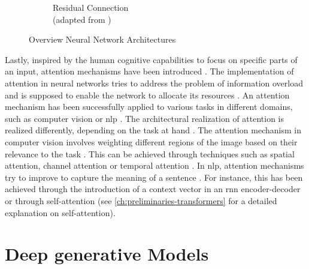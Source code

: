 \begin{figure}
\begin{subfigure}{0.7\textwidth}
        \captionsetup{justification=centering}
        \caption{Residual Connection \\(adapted from \cite{hassan2019ResNet3450})} \label{fig:resnet}
      \end{subfigure}%
    \hspace*{\fill}   %
  \caption[Overview Neural Network Architectures]{Overview Neural Network Architectures} \label{fig:NN_architectures_Overview}
\end{figure}

Lastly, inspired by the human cognitive capabilities to focus on specific parts of an input, attention mechanisms have been introduced \cite{niu2021ReviewAttentionMechanism, aggarwal2018NeuralNetworksDeep}.
The implementation of attention in neural networks tries to address the problem of information overload and is supposed to enable the network to allocate its resources \cite{niu2021ReviewAttentionMechanism}.
An attention mechanism has been successfully applied to various tasks in different domains, such as computer vision or \gls{nlp} \cite{niu2021ReviewAttentionMechanism}.
The architectural realization of attention is realized differently, depending on the task at hand \cite{aggarwal2018NeuralNetworksDeep}.
The attention mechanism in computer vision involves weighting different regions of the image based on their relevance to the task \cite{aggarwal2018NeuralNetworksDeep}. 
This can be achieved through techniques such as spatial attention, channel attention or temporal attention \cite{guo2022AttentionMechanismsComputer}.
In \gls{nlp}, attention mechanisms try to improve to capture the meaning of a sentence \cite{niu2021ReviewAttentionMechanism}. 
For instance, this has been achieved through the introduction of a context vector in an \gls{rnn} encoder-decoder \cite{DBLP:journals/corr/BahdanauCB14} or through self-attention \cite{vaswani2017AttentionAllYou} (see \autoref{ch:preliminaries-transformers} for a detailed explanation on self-attention).

\section{Deep generative Models}
\label{ch:preliminaries-generativeMlgorithms}

